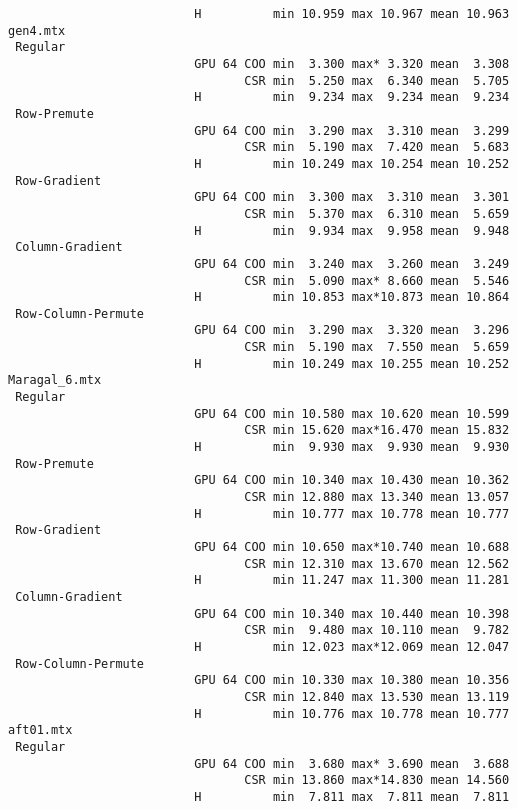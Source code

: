 {\begin{verbatim}
                          H          min 10.959 max 10.967 mean 10.963
gen4.mtx
 Regular
                          GPU 64 COO min  3.300 max* 3.320 mean  3.308
                                 CSR min  5.250 max  6.340 mean  5.705
                          H          min  9.234 max  9.234 mean  9.234
 Row-Premute
                          GPU 64 COO min  3.290 max  3.310 mean  3.299
                                 CSR min  5.190 max  7.420 mean  5.683
                          H          min 10.249 max 10.254 mean 10.252
 Row-Gradient
                          GPU 64 COO min  3.300 max  3.310 mean  3.301
                                 CSR min  5.370 max  6.310 mean  5.659
                          H          min  9.934 max  9.958 mean  9.948
 Column-Gradient
                          GPU 64 COO min  3.240 max  3.260 mean  3.249
                                 CSR min  5.090 max* 8.660 mean  5.546
                          H          min 10.853 max*10.873 mean 10.864
 Row-Column-Permute
                          GPU 64 COO min  3.290 max  3.320 mean  3.296
                                 CSR min  5.190 max  7.550 mean  5.659
                          H          min 10.249 max 10.255 mean 10.252
Maragal_6.mtx
 Regular
                          GPU 64 COO min 10.580 max 10.620 mean 10.599
                                 CSR min 15.620 max*16.470 mean 15.832
                          H          min  9.930 max  9.930 mean  9.930
 Row-Premute
                          GPU 64 COO min 10.340 max 10.430 mean 10.362
                                 CSR min 12.880 max 13.340 mean 13.057
                          H          min 10.777 max 10.778 mean 10.777
 Row-Gradient
                          GPU 64 COO min 10.650 max*10.740 mean 10.688
                                 CSR min 12.310 max 13.670 mean 12.562
                          H          min 11.247 max 11.300 mean 11.281
 Column-Gradient
                          GPU 64 COO min 10.340 max 10.440 mean 10.398
                                 CSR min  9.480 max 10.110 mean  9.782
                          H          min 12.023 max*12.069 mean 12.047
 Row-Column-Permute
                          GPU 64 COO min 10.330 max 10.380 mean 10.356
                                 CSR min 12.840 max 13.530 mean 13.119
                          H          min 10.776 max 10.778 mean 10.777
aft01.mtx
 Regular
                          GPU 64 COO min  3.680 max* 3.690 mean  3.688
                                 CSR min 13.860 max*14.830 mean 14.560
                          H          min  7.811 max  7.811 mean  7.811

\end{verbatim}}
